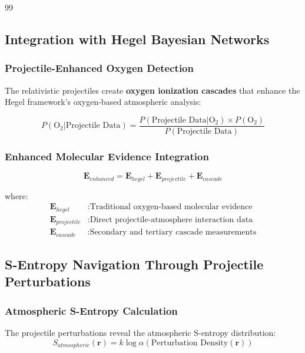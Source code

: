 \documentclass[12pt,a4paper]{article}
\begin{document}
\begin{thebibliography}{99}
\subsection{Integration with Hegel Bayesian Networks}

\subsubsection{Projectile-Enhanced Oxygen Detection}

The relativistic projectiles create \textbf{oxygen ionization cascades} that enhance the Hegel framework's \cite{hegel_bayesian} oxygen-based atmospheric analysis:

\begin{equation}
P(\text{O}_2 | \text{Projectile Data}) = \frac{P(\text{Projectile Data} | \text{O}_2) \times P(\text{O}_2)}{P(\text{Projectile Data})}
\end{equation}

\subsubsection{Enhanced Molecular Evidence Integration}
\begin{equation}
\mathbf{E}_{enhanced} = \mathbf{E}_{hegel} + \mathbf{E}_{projectile} + \mathbf{E}_{cascade}
\end{equation}

where:
\begin{align}
\mathbf{E}_{hegel} &: \text{Traditional oxygen-based molecular evidence} \\
\mathbf{E}_{projectile} &: \text{Direct projectile-atmosphere interaction data} \\
\mathbf{E}_{cascade} &: \text{Secondary and tertiary cascade measurements}
\end{align}

\subsection{S-Entropy Navigation Through Projectile Perturbations}

\subsubsection{Atmospheric S-Entropy Calculation}

The projectile perturbations reveal the atmospheric S-entropy distribution:
\begin{equation}
S_{atmospheric}(\mathbf{r}) = k \log \alpha(\text{Perturbation Density}(\mathbf{r}))
\end{equation}


\end{thebibliography}
\end{document}

